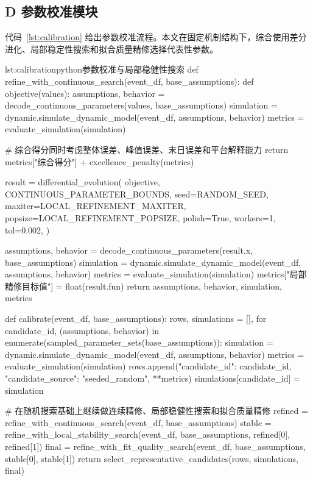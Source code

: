 \clearpage

\subsection*{D 参数校准模块}

代码~\ref{lst:calibration} 给出参数校准流程。本文在固定机制结构下，综合使用差分进化、局部稳定性搜索和拟合质量精修选择代表性参数。

\begin{paperlisting}{lst:calibration}{python}{参数校准与局部稳健性搜索}
def refine_with_continuous_search(event_df, base_assumptions):
    def objective(values):
        assumptions, behavior = decode_continuous_parameters(values, base_assumptions)
        simulation = dynamic.simulate_dynamic_model(event_df, assumptions, behavior)
        metrics = evaluate_simulation(simulation)

        # 综合得分同时考虑整体误差、峰值误差、末日误差和平台解释能力
        return metrics["综合得分"] + excellence_penalty(metrics)

    result = differential_evolution(
        objective,
        CONTINUOUS_PARAMETER_BOUNDS,
        seed=RANDOM_SEED,
        maxiter=LOCAL_REFINEMENT_MAXITER,
        popsize=LOCAL_REFINEMENT_POPSIZE,
        polish=True,
        workers=1,
        tol=0.002,
    )

    assumptions, behavior = decode_continuous_parameters(result.x, base_assumptions)
    simulation = dynamic.simulate_dynamic_model(event_df, assumptions, behavior)
    metrics = evaluate_simulation(simulation)
    metrics["局部精修目标值"] = float(result.fun)
    return assumptions, behavior, simulation, metrics

def calibrate(event_df, base_assumptions):
    rows, simulations = [], {}
    for candidate_id, (assumptions, behavior) in enumerate(sampled_parameter_sets(base_assumptions)):
        simulation = dynamic.simulate_dynamic_model(event_df, assumptions, behavior)
        metrics = evaluate_simulation(simulation)
        rows.append({"candidate_id": candidate_id, "candidate_source": "seeded_random",
                     **metrics})
        simulations[candidate_id] = simulation

    # 在随机搜索基础上继续做连续精修、局部稳健性搜索和拟合质量精修
    refined = refine_with_continuous_search(event_df, base_assumptions)
    stable = refine_with_local_stability_search(event_df, base_assumptions,
                                                refined[0], refined[1])
    final = refine_with_fit_quality_search(event_df, base_assumptions,
                                           stable[0], stable[1])
    return select_representative_candidates(rows, simulations, final)
\end{paperlisting}

